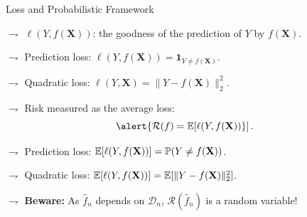 \documentclass[xcolor={usenames,dvipsnames},handout]{beamer}
\begin{document}
\begin{frame}{Loss and Probabilistic Framework}

$\rightharpoondown$ $\ell(Y,f(\textbf{X}))$: the goodness of the prediction of $Y$ by $f(\textbf{X})$.

$\rightharpoondown$ \alert{Prediction} loss: $\ell(Y,f(\textbf{X}))=\mathbf{1}_{Y\neq f(\textbf{X})}$.

$\rightharpoondown$  \alert{Quadratic} loss: $\ell(Y,\textbf{X})=\|Y-f(\textbf{X})\|_2^2$.

\vspace{.5cm}


$\rightharpoondown$ Risk measured as the average loss:
	\[
	\alert{\mathcal{R}(f)=\E[\ell(Y,f(\textbf{X}))}]\,.
	\]

$\rightharpoondown$ \alert{Prediction} loss: $\mathbb{E}[\ell(Y,f(\textbf{X}))]=\mathbb{P}(Y\neq f(\textbf{X}))$.

$\rightharpoondown$ \alert{Quadratic} loss: $\mathbb{E}[\ell(Y,f(\textbf{X}))]=\mathbb{E}[\|Y-f(\textbf{X})\|_2^2]$.

\vspace{.3cm}

$\rightharpoondown$ {\color{Vert} \textbf{Beware:}}  As $\widehat{f}_n$ depends on $\mathcal{D}_n$, $\mathcal{R}(\widehat{f}_n)$ is a random variable!

\end{frame}



%
%
\end{document}

